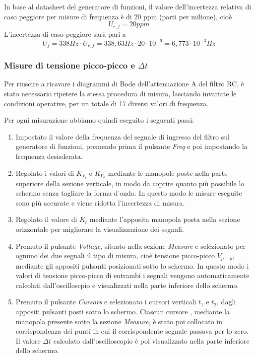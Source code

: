 In base al datasheet del generatore di funzioni, il valore dell'incertezza relativa di caso peggiore per misure di frequenza è di 20 ppm (parti per milione), cioè 
\[U_{r,f} = 20 ppm\]
L'incertezza di caso peggiore sarà pari a
\[U_f = 338 Hz\cdot U_{r,f} = 338,63Hz \cdot 20 \cdot 10^{-6} = 6,773\cdot10^{-3}Hz\]


\clearpage
\subsubsection{Misure di tensione picco-picco e $\Delta t$}

Per riuscire a ricavare i diagrammi di Bode dell'attenuazione A del filtro RC, è stato necessario ripetere la stessa procedura di misura, lasciando invariate le condizioni operative, per un totale di 17 diversi valori di frequenza.

Per ogni misurazione abbiamo quindi eseguito i seguenti passi:
\begin{enumerate}
    \item Impostato il valore della frequenza del segnale di ingresso del filtro  sul generatore di funzioni, premendo prima il pulsante \emph{Freq} e poi impostando la frequenza desisderata.
    \item Regolato i valori di $K_{V_i}$ e $K_{V_o}$ mediante le manopole poste nella parte superiore della sezione verticale, in modo da coprire quanto più possibile lo schermo senza tagliare la forma d'onda. In questo modo le misure eseguite sono più accurate e viene ridotta l'incertezza di misura.
    \item Regolato il valore di $K_t$ mediante l'apposita manopola posta nella sezione orizzontale per migliorare la visualizzazione dei segnali.
    \item Premuto il pulsante \emph{Voltage}, situato nella sezione \emph{Measure} e selezionato per ognuno dei due segnali il tipo di misura, cioè tensione picco-picco $V_{p-p}$, mediante gli appositi pulsanti posizionati sotto lo schermo.
    In questo modo i valori di tensione picco-picco di entrambi i segnali vengono automaticamente calcolati dall'oscilloscpio e visualizzati nella parte inferiore dello schermo.
    \item Premuto il pulsante \emph{Cursors} e selezionato i cursori verticali $t_1$ e $t_2$, dagli appositi pulsanti posti sotto lo schermo. Ciascun cursore , mediante la manopola presente sotto la sezione \emph{Measure}, è stato poi collocato in corrispondenza dei punti in cui il corrispondente segnale passava per lo zero. Il valore $\Delta t$  calcolato dall'oscilloscopio è poi visualizzato nella parte inferiore dello schermo. 
    
\end{enumerate}

